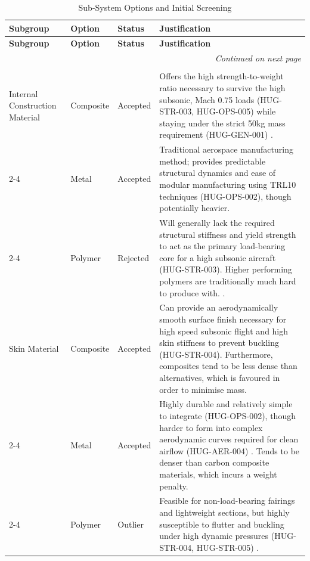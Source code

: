 \begin{longtable}{|p{1.6cm}|p{2.3cm}|p{1.6cm}|p{9.5cm}|}
\caption{Sub-System Options and Initial Screening} \label{tab:subsystem_screening} \\
\hline
\textbf{Subgroup} & \textbf{Option} & \textbf{Status} & \textbf{Justification} \\
\hline
\endfirsthead
\hline
\textbf{Subgroup} & \textbf{Option} & \textbf{Status} & \textbf{Justification} \\
\hline
\endhead
\hline
\multicolumn{4}{r}{\textit{Continued on next page}} \\
\endfoot
\hline
\endlastfoot

\multicolumn{4}{|c|}{\textbf{Fuselage Group}} \\
\hline
Internal Construction Material & Composite & Accepted & Offers the high strength-to-weight ratio necessary to survive the high subsonic, Mach 0.75 loads (HUG-STR-003, HUG-OPS-005) while staying under the strict 50kg mass requirement (HUG-GEN-001) \cite{raymer1992aircraft}. \\
\cline{2-4}
\multicolumn{1}{|l|}{} & Metal & Accepted & Traditional aerospace manufacturing method; provides predictable structural dynamics and ease of modular manufacturing using TRL10 techniques (HUG-OPS-002), though potentially heavier. \\
\cline{2-4}
\multicolumn{1}{|l|}{} & Polymer & Rejected & Will generally lack the required structural stiffness and yield strength to act as the primary load-bearing core for a high subsonic aircraft (HUG-STR-003). Higher performing polymers are traditionally much hard to produce with. \cite{raymer1992aircraft}. \\
\hline
Skin Material & Composite & Accepted & Can provide an aerodynamically smooth surface finish necessary for high speed subsonic flight and high skin stiffness to prevent buckling (HUG-STR-004). Furthermore, composites tend to be less dense than alternatives, which is favoured in order to minimise mass.\\
\cline{2-4}
\multicolumn{1}{|l|}{} & Metal & Accepted & Highly durable and relatively simple to integrate (HUG-OPS-002), though harder to form into complex aerodynamic curves required for clean airflow (HUG-AER-004) \cite{raymer1992aircraft, Vos}. Tends to be denser than carbon composite materials, which incurs a weight penalty. \\
\cline{2-4}
\multicolumn{1}{|l|}{} & Polymer & Outlier & Feasible for non-load-bearing fairings and lightweight sections, but highly susceptible to flutter and buckling under high dynamic pressures (HUG-STR-004, HUG-STR-005) \cite{raymer1992aircraft}. \\

\end{longtable}
